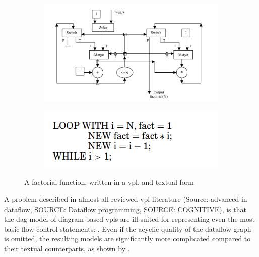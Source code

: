 \begin{figure}
  \centering
  \begin{subfigure}[b]{0.45\linewidth}
    \graphicspath{{../../assets/images/background/vpl/}}
    \centering
    \includegraphics[width=\linewidth]{iteration-vpl.png}
    \caption{}\label{fig:vpl-iteration:1}
  \end{subfigure}%
  \qquad %
  \begin{subfigure}[b]{0.45\linewidth}
    \graphicspath{{../../assets/images/background/vpl/}}
    \centering
    \includegraphics[width=\linewidth]{iteration-text.png}
    \caption{}\label{fig:vpl-iteration:2}
  \end{subfigure}%
  \caption[Comparrison of iteration]{A factorial function, written in a vpl, and textual form}%
  \label{fig:vpl-iteration}
  \end{figure}

A problem described in almost all reviewed vpl literature (Source: advanced in dataflow, SOURCE: Dataflow programming,  SOURCE: COGNITIVE), is that the \ac{dag} model of diagram-based vpls are ill-suited for representing even the most basic flow control statements: .
Even if the acyclic quality of the dataflow graph is omitted, the resulting models are significantly more complicated compared to their textual counterparts, as shown by .

